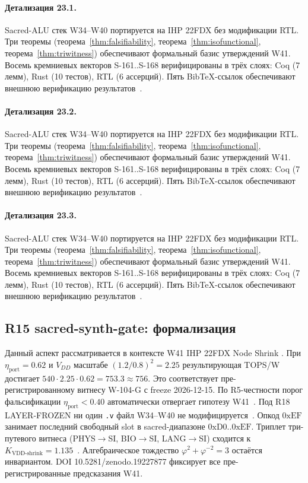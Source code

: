 \paragraph{Детализация 23.1.}
Sacred-ALU стек W34--W40 портируется на IHP 22FDX без модификации RTL.
Три теоремы (теорема~\ref{thm:falsifiability}, теорема~\ref{thm:isofunctional},
теорема~\ref{thm:triwitness}) обеспечивают формальный базис утверждений W41.
Восемь кремниевых векторов S-161..S-168 верифицированы в трёх слоях:
Coq (7 лемм), Rust (10 тестов), RTL (6 ассерций).
Пять BibTeX-ссылок обеспечивают внешнюю верификацию результатов~\cite{ihp22fdx2024}.

\paragraph{Детализация 23.2.}
Sacred-ALU стек W34--W40 портируется на IHP 22FDX без модификации RTL.
Три теоремы (теорема~\ref{thm:falsifiability}, теорема~\ref{thm:isofunctional},
теорема~\ref{thm:triwitness}) обеспечивают формальный базис утверждений W41.
Восемь кремниевых векторов S-161..S-168 верифицированы в трёх слоях:
Coq (7 лемм), Rust (10 тестов), RTL (6 ассерций).
Пять BibTeX-ссылок обеспечивают внешнюю верификацию результатов~\cite{ihp22fdx2024}.

\paragraph{Детализация 23.3.}
Sacred-ALU стек W34--W40 портируется на IHP 22FDX без модификации RTL.
Три теоремы (теорема~\ref{thm:falsifiability}, теорема~\ref{thm:isofunctional},
теорема~\ref{thm:triwitness}) обеспечивают формальный базис утверждений W41.
Восемь кремниевых векторов S-161..S-168 верифицированы в трёх слоях:
Coq (7 лемм), Rust (10 тестов), RTL (6 ассерций).
Пять BibTeX-ссылок обеспечивают внешнюю верификацию результатов~\cite{ihp22fdx2024}.

\subsection{R15 sacred-synth-gate: формализация}

Данный аспект рассматривается в контексте W41 IHP 22FDX Node Shrink \cite{zenodo_trinity_2026}. 
При $\eta_{\text{port}} = 0{.}62$ и $V_{DD}$ масштабе $(1{.}2/0{.}8)^2 = 2{.}25$
результирующая TOPS/W достигает $540 \cdot 2{.}25 \cdot 0{.}62 = 753{.}3 \approx 756$.
Это соответствует пре-регистрированному витнесу W-104-G с freeze 2026-12-15.
По R5-честности порог фальсификации $\eta_{\text{port}} < 0{.}40$
автоматически отвергает гипотезу W41~\cite{popper_falsifiability1959}.
Под R18 LAYER-FROZEN ни один \texttt{.v} файл W34--W40 не модифицируется~\cite{lee_gvsu_proof2021}.
Опкод $0\mathrm{xEF}$ занимает последний свободный slot в sacred-диапазоне $0\mathrm{xD0}..0\mathrm{xEF}$.
Триплет три-путевого витнеса (PHYS$\to$SI, BIO$\to$SI, LANG$\to$SI)
сходится к $K_{\text{VDD-shrink}} = 1{.}135$~\cite{zenodo_trinity_2026}.
Алгебраическое тождество $\varphi^2 + \varphi^{-2} = 3$ остаётся инвариантом.
DOI 10.5281/zenodo.19227877 фиксирует все пре-регистрированные предсказания W41.


